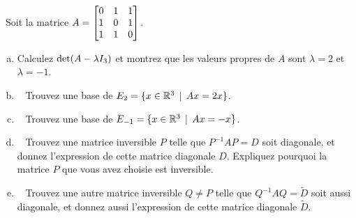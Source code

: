 \begin{prob} \label{prob23.3}\sov~Soit la matrice $A=\bmatrix
0&1&1\\ 1&0&1\\ 1&1&0 \endbmatrix$. 

\begin{enumerate}[a)]

\item Calculez $\det(A-\lambda I_3)$ et montrez que les valeurs propres de
$A$ sont $\lambda = 2$ et $\lambda = -1$.

\item\sov~ Trouvez une base de $E_2 =\{x\in \mathbb{R}^3 \, \mid \, Ax= 2x\}$.
\item\sov~ Trouvez une base de $E_{-1} =\{x\in \mathbb{R}^3 \, \mid \, Ax=-x\}$. 
 
\item\sov~ Trouvez une matrice inversible 
$P$ telle que $P^{-1}AP=D$ soit diagonale, et donnez l'expression de cette matrice diagonale $D$. Expliquez pourquoi
la matrice $P$ que vous avez choisie est inversible.
\item\sov~ Trouvez une autre matrice inversible
$Q \not=P$ telle que $Q^{-1}AQ=\tilde D$ soit aussi diagonale, et donnez aussi l'expression de cette matrice diagonale $\tilde D$.
\end{enumerate}
  


\end{prob} 
